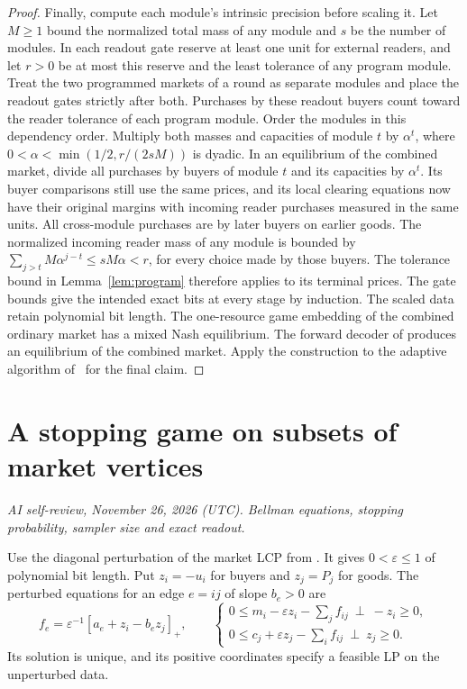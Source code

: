 \documentclass[11pt,oneside,openany,notitlepage]{report}
\newcommand{\reviewdate}{November 26, 2026 (UTC)}
\newcommand{\reviewmark}[1]{\par\nopagebreak[4]\noindent
  {\footnotesize\itshape AI self-review, \reviewdate. #1\par}\nobreak\smallskip}
\begin{document}
\begin{proof}
Finally, compute each module's intrinsic precision before scaling it.
Let \(M\ge1\) bound the normalized total mass of any module and \(s\)
be the number of modules. In each readout gate reserve at least one
unit for external readers, and let \(r>0\) be at most this reserve and
the least tolerance of any program module. Treat the two programmed
markets of a round as separate modules and place the readout gates
strictly after both. Purchases by these readout buyers count toward the reader tolerance of
each program module. Order the modules in this dependency order.
Multiply both masses and capacities of module \(t\) by \(\alpha^t\),
where \(0<\alpha<\min(1/2,r/(2sM))\) is dyadic. In an equilibrium
of the combined market, divide all purchases by buyers of module \(t\)
and its capacities by \(\alpha^t\). Its buyer comparisons still use the
same prices, and its local clearing equations now have their original
margins with incoming reader purchases measured in the same units. All
cross-module purchases are by later buyers on earlier goods. The normalized
incoming reader mass of any module is bounded by
\(\sum_{j>t}M\alpha^{j-t}\le sM\alpha<r\), for every choice made by
those buyers. The tolerance bound in Lemma~\ref{lem:program} therefore
applies to its terminal prices. The gate bounds give the intended exact
bits at every stage by induction. The scaled data retain
polynomial bit length. The one-resource game embedding of the combined ordinary market has a
mixed Nash equilibrium. The forward decoder of
\cite[Theorem~3.16]{book} produces an equilibrium of the combined market. Apply the construction to
the adaptive algorithm of~\cite[Theorem~3.1]{book} for the final claim.
\end{proof}

\chapter{A stopping game on subsets of market vertices}\label{sec:subset}
\reviewmark{Bellman equations, stopping probability, sampler size and exact readout.}

Use the diagonal perturbation of the market LCP from
\cite[Theorem~5.6]{book}. It gives \(0<\varepsilon\le1\) of polynomial
bit length. Put \(z_i=-u_i\) for buyers and \(z_j=P_j\) for goods. The
perturbed equations for an edge \(e=ij\) of slope \(b_e>0\) are
\[
 f_e=\varepsilon^{-1}[a_e+z_i-b_ez_j]_+,\qquad
 \begin{cases}
 0\le m_i-\varepsilon z_i-\sum_j f_{ij}\ \perp\ -z_i\ge0,\\
 0\le c_j+\varepsilon z_j-\sum_i f_{ij}\ \perp\ z_j\ge0 .
 \end{cases}
\]
Its solution is unique, and its positive coordinates specify a feasible
LP on the unperturbed data.
\end{document}
